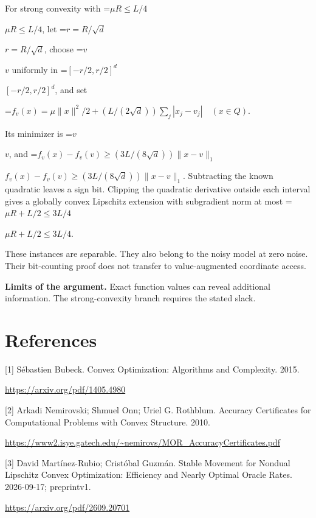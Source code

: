 \documentclass[10pt,a4paper]{article}
\newcommand{\AtlasMath}[1]{\par\begingroup\centering\setbox0=\hbox{$\displaystyle #1$}\ifdim\wd0>1.4\linewidth\typeout{ATLAS WIDE FORMULA: \the\wd0}\fi\ifdim\wd0>\linewidth\resizebox{\linewidth}{!}{\box0}\else\box0\fi\par\endgroup}
\newcommand{\AtlasInlineMath}[1]{\begingroup\setbox0=\hbox{$#1$}\ifdim\wd0>.4\linewidth\endgroup\AtlasMath{#1}\else\endgroup$#1$\fi}
\begin{document}
For strong convexity with \AtlasInlineMath{\mu R\le L/4}, let \AtlasInlineMath{r=R/\sqrt d}, choose \AtlasInlineMath{v} uniformly in \AtlasInlineMath{[-r/2,r/2]^d}, and set

\AtlasMath{f_v(x)=\mu\|x\|^2/2+(L/(2\sqrt d))\sum_j|x_j-v_j|
\quad(x\in Q).}

Its minimizer is \AtlasInlineMath{v}, and
\AtlasInlineMath{f_v(x)-f_v(v)\ge(3L/(8\sqrt d))\|x-v\|_1}.
Subtracting the known quadratic leaves a sign bit. Clipping the quadratic derivative outside each interval gives a globally convex Lipschitz extension with subgradient norm at most \AtlasInlineMath{\mu R+L/2\le3L/4}.

These instances are separable. They also belong to the noisy model at zero noise. Their bit-counting proof does not transfer to value-augmented coordinate access.

\textbf{Limits of the argument.} Exact function values can reveal additional information. The strong-convexity branch requires the stated slack.

\section{References}
[1] Sébastien Bubeck. Convex Optimization: Algorithms and Complexity. 2015.

\url{https://arxiv.org/pdf/1405.4980}

[2] Arkadi Nemirovski; Shmuel Onn; Uriel G. Rothblum. Accuracy Certificates for Computational Problems with Convex Structure. 2010.

\url{https://www2.isye.gatech.edu/~nemirovs/MOR_AccuracyCertificates.pdf}

[3] David Martínez-Rubio; Cristóbal Guzmán. Stable Movement for Nondual Lipschitz Convex Optimization: Efficiency and Nearly Optimal Oracle Rates. 2026-09-17; preprintv1.

\url{https://arxiv.org/pdf/2609.20701}
\end{document}
